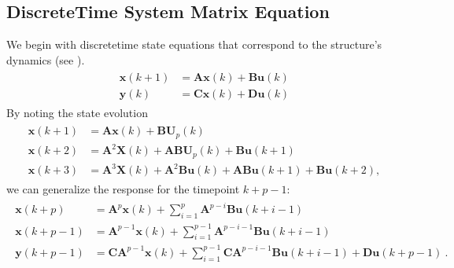 \documentclass[letterpaper,10pt,english]{sphinxmanual}
\begin{document}
\subsection{Discrete\sphinxhyphen{}Time System Matrix Equation}
\label{\detokenize{theory/srim:discrete-time-system-matrix-equation}}
\sphinxAtStartPar
We begin with discrete\sphinxhyphen{}time state equations that correspond to the
structure’s dynamics (see ).
\begin{equation*}
\begin{split}\begin{aligned}
\mathbf{x}(k+1) &= \mathbf{Ax}(k) + \mathbf{Bu}(k) \\
\mathbf{y}(k) &= \mathbf{Cx}(k) + \mathbf{Du}(k)
\end{aligned}\end{split}
\end{equation*}
\sphinxAtStartPar
By noting the state evolution
\begin{equation*}
\begin{split}\begin{aligned}
\mathbf{x}(k+1) &= \mathbf{Ax}(k)+\mathbf{B}\mathbf{U}_{p}(k)\\
\mathbf{x}(k+2) &= \mathbf{A}^2\mathbf{X}(k) + \mathbf{AB}\mathbf{U}_{p}(k) + \mathbf{Bu}(k+1)\\
\mathbf{x}(k+3) &= \mathbf{A}^{3}\mathbf{X}(k) + \mathbf{A}^{2}\mathbf{Bu}(k) + \mathbf{ABu}(k+1) + \mathbf{Bu}(k+2),
\end{aligned}\end{split}
\end{equation*}
\sphinxAtStartPar
we can generalize the response for the timepoint \(k+p-1\):
\begin{equation*}
\begin{split}\begin{aligned}
\mathbf{x}(k+p) &= \mathbf{A}^{p}\mathbf{x}(k) + \sum_{i=1}^{p}\mathbf{A}^{p-i}\mathbf{Bu}(k+i-1)
\\
\mathbf{x}(k+p-1) &= \mathbf{A}^{p-1}\mathbf{x}(k) + \sum_{i=1}^{p-1}\mathbf{A}^{p-i-1}\mathbf{Bu}(k+i-1)
\\
\mathbf{y}(k+p-1) &= \mathbf{CA}^{p-1}\mathbf{x}(k) + \sum_{i=1}^{p-1}\mathbf{CA}^{p-i-1}\mathbf{Bu}(k+i-1)+\mathbf{Du}(k+p-1)~.
\end{aligned}\end{split}
\end{equation*}
\end{document}
